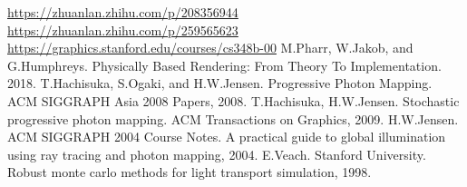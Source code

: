 \documentclass[12pt]{article}
\begin{document}
\begin{thebibliography}{3}
     \url{https://zhuanlan.zhihu.com/p/208356944}
     \url{https://zhuanlan.zhihu.com/p/259565623}
     \url{https://graphics.stanford.edu/courses/cs348b-00}
     M.Pharr, W.Jakob, and G.Humphreys. Physically Based Rendering: From Theory To Implementation. 2018.
     T.Hachisuka, S.Ogaki, and H.W.Jensen. Progressive Photon Mapping. ACM SIGGRAPH Asia 2008 Papers, 2008.
     T.Hachisuka, H.W.Jensen. Stochastic progressive photon mapping. ACM Transactions on Graphics, 2009.
     H.W.Jensen. ACM SIGGRAPH 2004 Course Notes. A practical guide to global illumination using ray tracing and photon mapping, 2004.
     E.Veach. Stanford University. Robust monte carlo methods for light transport simulation, 1998.
\end{thebibliography}
\end{document}
